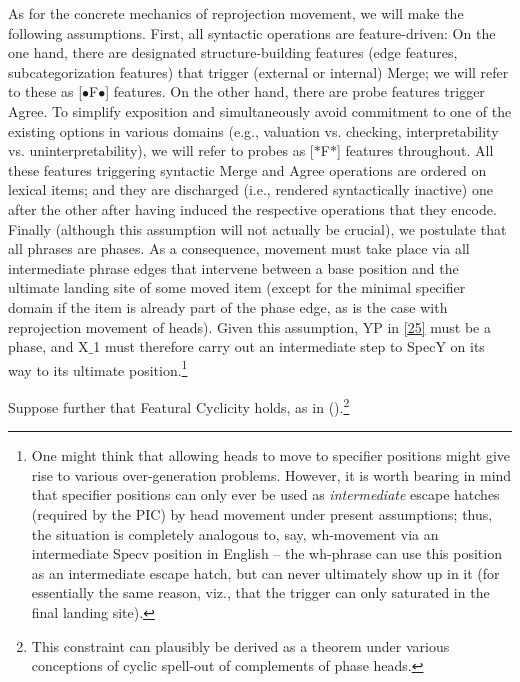 \documentclass[output=paper
,modfonts
,nonflat]{langsci/langscibook}
\begin{document}
As for the concrete mechanics of reprojection movement, we will make
the following assumptions. First,  all syntactic operations are
feature-driven: On the one hand, there are designated   structure-building features (edge features, subcategorization
features) that trigger (external or internal) Merge; we will refer to
these as [{\small $\bullet$}F{\small $\bullet$}] features. On the
other hand, there are   probe features trigger Agree. To simplify
exposition and simultaneously avoid commitment to one of the existing options in
various domains (e.g., valuation vs. checking, interpretability
vs. uninterpretability), we will refer to probes as 
 [$*$F$*$] features throughout.
All these features triggering syntactic Merge and Agree operations are
ordered on lexical items; and they are discharged (i.e., rendered
syntactically inactive) one after the other
after having induced the respective operations that they encode. 
Finally (although this assumption will not actually be crucial), we
postulate that all phrases are phases. As a consequence, movement must take place via all
  intermediate phrase edges  that intervene between a base position and
  the ultimate landing site of some moved item (except for the minimal
  specifier domain if the item is already part of the phase edge, as
  is the case with reprojection movement of heads). Given this
  assumption, YP in \ref{25} must be a phase, and X$\_$1 must therefore
  carry out an intermediate step to SpecY on its way to its ultimate
  position.\footnote{One might think that allowing heads to move to
    specifier positions might give rise to various over-generation
    problems. However, it is worth bearing in mind that specifier
    positions can only ever be used as {\itshape intermediate} escape
    hatches (required by the PIC) by head movement under present
    assumptions; thus, the situation is completely analogous to, say,
    wh-movement via an intermediate Specv position in English -- the
    wh-phrase can use this position as an intermediate escape hatch,
    but can never ultimately show up in it (for essentially the same
    reason, viz., that the trigger can only saturated in the final
    landing site).}

Suppose further that Featural Cyclicity holds, as in
(\Next).\footnote{This constraint can plausibly be derived as a theorem
  under various conceptions of cyclic spell-out of complements of
  phase heads.}
\end{document}
